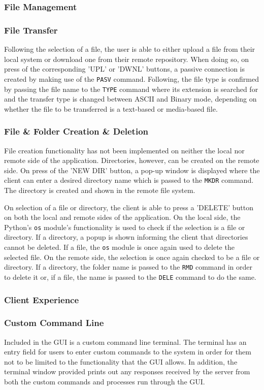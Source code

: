 \documentclass[10pt,twocolumn]{witseiepaper}
\begin{document}
\subsubsection{File Management}
\subsubsection*{File Transfer}
Following the selection of a file, the user is able to either upload a file from their local system or download one from their remote repository. When doing so, on press of the corresponding 'UPL' or 'DWNL' buttons, a passive connection is created by making use of the \texttt{PASV} command. Following, the file type is confirmed by passing the file name to the \texttt{TYPE} command where its extension is searched for and the transfer type is changed between ASCII and Binary mode, depending on whether the file to be transferred is a text-based or media-based file.

\subsubsection*{File \& Folder Creation \& Deletion}
File creation functionality has not been implemented on neither the local nor remote side of the application. Directories, however, can be created on the remote side. On press of the 'NEW DIR' button, a pop-up window is displayed where the client can enter a desired directory name which is passed to the \texttt{MKDR} command. The directory is created and shown in the remote file system. 

On selection of a file or directory, the client is able to press a 'DELETE' button on both the local and remote sides of the application. On the local side, the Python's \texttt{os} module's functionality is used to check if the selection is a file or directory. If a directory, a popup is shown informing the client that directories cannot be deleted. If a file, the \texttt{os} module is once again used to delete the selected file. On the remote side, the selection is once again checked to be a file or directory. If a directory, the folder name is passed to the \texttt{RMD} command in order to delete it or, if a file, the name is passed to the \texttt{DELE} command to do the same.

\subsubsection{Client Experience}
\subsubsection*{Custom Command Line}
Included in the GUI is  a custom command line terminal. The terminal has an entry field for users to enter custom commands to the system in order for them not to be limited to the functionality that the GUI allows. In addition, the terminal window provided prints out any responses received by the server from both the custom commands and processes run through the GUI.
\end{document}
